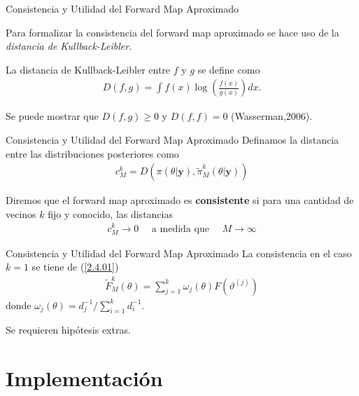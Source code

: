 \documentclass[10pt,aspectratio=169]{beamer}
\begin{document}
\begin{frame}{Consistencia y Utilidad del Forward Map Aproximado}

  Para formalizar la consistencia del forward map  aproximado se hace uso de la \textit{distancia de Kullback-Leibler}.

  La distancia de Kullback-Leibler entre $f$ y $g$ se define como
  \begin{align*}
      D(f,g) = \int f(x)\log \left(\frac{f(x)}{g(x)}\right) dx.
  \end{align*}

  Se puede mostrar que $D(f,g) \geq 0$ y $D(f,f) = 0$ (Wasserman,2006).

\end{frame}

\begin{frame}{Consistencia y Utilidad del Forward Map Aproximado}
  Definamos la distancia entre las distribuciones posteriores como
  \begin{align*}
      c^k_M = D \left( \pi(\theta|\mathbf{y}),\tilde{\pi}^{k}_M(\theta|\mathbf{y})\right)
  \end{align*}

  Diremos que el forward map aproximado es \textbf{consistente} si para una cantidad de vecinos $k$ fijo y conocido, las distancias 
  \begin{align*}
      c^k_M \rightarrow 0 \:\:\:\:\:\: \text{a medida que}\:\:\:\:\:\: M \rightarrow \infty
  \end{align*}
\end{frame}



\begin{frame}{Consistencia y Utilidad del Forward Map Aproximado}
  La consistencia en el caso $k=1$ se tiene de (\ref{2.4.01})
  \begin{align*}
    \tilde{F}^{k}_M(\theta) = \sum_{j = 1}^{k} \omega_j(\theta) F \left(\vartheta^{(j)}\right)
  \end{align*}
  donde $\omega_j(\theta) = d_j^{-1}/ \sum_{i=1}^{k} d_i^{-1}$.

  \vspace{0.5 cm}

  Se requieren hipótesis extras.
\end{frame}

\section{Implementación}
\end{document}
